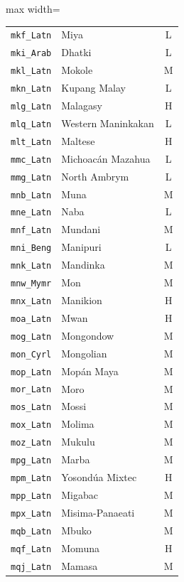 {\begin{adjustbox}{max width=\textwidth}
\begin{tabular}{llc}
        \texttt{mkf\_Latn} & Miya & L \\
        \texttt{mki\_Arab} & Dhatki & L \\
        \texttt{mkl\_Latn} & Mokole & M \\
        \texttt{mkn\_Latn} & Kupang Malay & L \\
        \texttt{mlg\_Latn} & Malagasy & H \\
        \texttt{mlq\_Latn} & Western Maninkakan & L \\
        \texttt{mlt\_Latn} & Maltese & H \\
        \texttt{mmc\_Latn} & Michoacán Mazahua & L \\
        \texttt{mmg\_Latn} & North Ambrym & L \\
        \texttt{mnb\_Latn} & Muna & M \\
        \texttt{mne\_Latn} & Naba & L \\
        \texttt{mnf\_Latn} & Mundani & M \\
        \texttt{mni\_Beng} & Manipuri & L \\
        \texttt{mnk\_Latn} & Mandinka & M \\
        \texttt{mnw\_Mymr} & Mon & M \\
        \texttt{mnx\_Latn} & Manikion & H \\
        \texttt{moa\_Latn} & Mwan & H \\
        \texttt{mog\_Latn} & Mongondow & M \\
        \texttt{mon\_Cyrl} & Mongolian & M \\
        \texttt{mop\_Latn} & Mopán Maya & M \\
        \texttt{mor\_Latn} & Moro & M \\
        \texttt{mos\_Latn} & Mossi & M \\
        \texttt{mox\_Latn} & Molima & M \\
        \texttt{moz\_Latn} & Mukulu & M \\
        \texttt{mpg\_Latn} & Marba & M \\
        \texttt{mpm\_Latn} & Yosondúa Mixtec & H \\
        \texttt{mpp\_Latn} & Migabac & M \\
        \texttt{mpx\_Latn} & Misima-Panaeati & M \\
        \texttt{mqb\_Latn} & Mbuko & M \\
        \texttt{mqf\_Latn} & Momuna & H \\
        \texttt{mqj\_Latn} & Mamasa & M \\

\end{tabular}
\end{adjustbox}}
